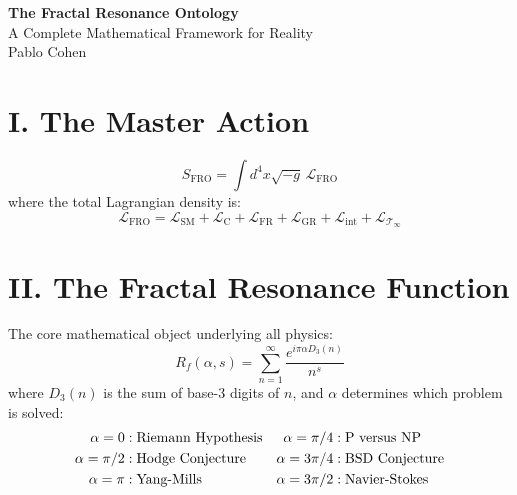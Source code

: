 \documentclass[11pt]{article}
\begin{document}
\begin{center}
{\LARGE \textbf{The Fractal Resonance Ontology}}\\
\vspace{0.2cm}
{\large A Complete Mathematical Framework for Reality}\\
\vspace{0.1cm}
{\normalsize Pablo Cohen}
\end{center}

\section*{I. The Master Action}

\begin{tcolorbox}[colback=blue!5!white,colframe=primary]
\begin{equation}
S_{\text{FRO}} = \int d^4x\sqrt{-g}\,\mathcal{L}_{\text{FRO}}
\end{equation}
where the total Lagrangian density is:
\begin{equation}
\mathcal{L}_{\text{FRO}} = \mathcal{L}_{\text{SM}} + \mathcal{L}_{\text{C}} + \mathcal{L}_{\text{FR}} + \mathcal{L}_{\text{GR}} + \mathcal{L}_{\text{int}} + \mathcal{L}_{\mathcal{T}_\infty}
\end{equation}
\end{tcolorbox}

\section*{II. The Fractal Resonance Function}

\begin{tcolorbox}[colback=green!5!white,colframe=tertiary]
The core mathematical object underlying all physics:
\begin{equation}
R_f(\alpha, s) = \sum_{n=1}^{\infty} \frac{e^{i\pi\alpha D_3(n)}}{n^s}
\end{equation}
where $D_3(n)$ is the sum of base-3 digits of $n$, and $\alpha$ determines which problem is solved:
\begin{align}
\alpha = 0 &: \text{Riemann Hypothesis} & \alpha = \pi/4 &: \text{P versus NP} \notag\\
\alpha = \pi/2 &: \text{Hodge Conjecture} & \alpha = 3\pi/4 &: \text{BSD Conjecture} \notag\\
\alpha = \pi &: \text{Yang-Mills} & \alpha = 3\pi/2 &: \text{Navier-Stokes}
\end{align}
\end{tcolorbox}
\end{document}
